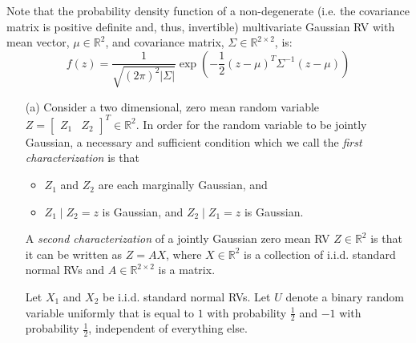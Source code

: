 \documentclass{article}
\begin{document}
Note that the probability density function of a non-degenerate (i.e. the covariance matrix is positive definite and, thus, invertible) multivariate Gaussian RV with mean vector, $\mu \in \mathbb{R}^{2}$, and covariance matrix, $\Sigma \in \mathbb{R}^{2 \times 2}$, is:
    \begin{equation*}
        f(z) = \dfrac{1}{\sqrt{(2\pi)^{2}\lvert \Sigma \rvert}}\exp\left(-\dfrac{1}{2}(z - \mu)^{T} \Sigma^{-1} (z - \mu)\right)
    \end{equation*}
    \begin{itemize}
        \item [(a)] Consider a two dimensional, zero mean random variable $Z = \begin{bmatrix}
            Z_{1} & Z_{2}   
        \end{bmatrix}^{T} \in \mathbb{R}^{2}$. In order for the random variable to be jointly Gaussian, a necessary and sufficient condition which we call the \textit{first characterization} is that
            \begin{itemize}
                \item $Z_{1}$ and $Z_{2}$ are each marginally Gaussian, and

                \item $Z_{1} \mid Z_{2} = z$ is Gaussian, and $Z_{2} \mid Z_{1} = z$ is Gaussian.
            \end{itemize}
        A \textit{second characterization} of a jointly Gaussian zero mean RV $Z \in \mathbb{R}^{2}$ is that it can be written as $Z = AX$, where $X \in \mathbb{R}^{2}$ is a collection of i.i.d. standard normal RVs and $A \in \mathbb{R}^{2 \times 2}$ is a matrix.

        Let $X_{1}$ and $X_{2}$ be i.i.d. standard normal RVs. Let $U$ denote a binary random variable uniformly that is equal to $1$ with probability $\frac{1}{2}$ and $-1$ with probability $\frac{1}{2}$, independent of everything else.


\end{itemize}
\end{document}
